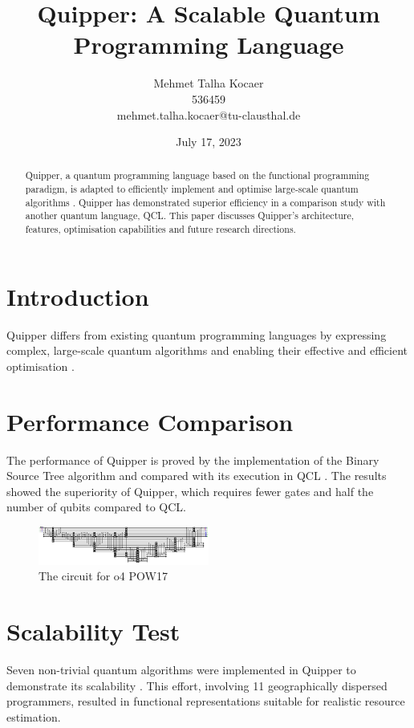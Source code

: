 \documentclass[11pt, twocolumn]{article}
\title{Quipper: A Scalable Quantum Programming Language}
\author{Mehmet Talha Kocaer\\ 536459\\ mehmet.talha.kocaer@tu-clausthal.de}
\date{July 17, 2023}
\begin{document}
\maketitle

\begin{abstract}
    Quipper, a quantum programming language based on the functional programming paradigm, is adapted to efficiently implement and optimise large-scale quantum algorithms \cite{DBLP:journals/corr/abs-1304-3390}. Quipper has demonstrated superior efficiency in a comparison study with another quantum language, QCL. This paper discusses Quipper's architecture, features, optimisation capabilities and future research directions.
\end{abstract}

\section{Introduction}
Quipper differs from existing quantum programming languages by expressing complex, large-scale quantum algorithms and enabling their effective and efficient optimisation
\cite{DBLP:journals/corr/abs-1304-3390}.

\section{Performance Comparison}
The performance of Quipper is proved by the implementation of the Binary Source Tree algorithm and compared with its execution in QCL \cite{DBLP:journals/corr/abs-1304-3390}. The results showed the superiority of Quipper, which requires fewer gates and half the number of qubits compared to QCL.

\begin{figure}[h]
\centering
\includegraphics[width=0.5\textwidth]{img2.png}
\caption{The circuit for o4 POW17}
\end{figure}

\section{Scalability Test}
Seven non-trivial quantum algorithms were implemented in Quipper to demonstrate its scalability \cite{DBLP:journals/corr/abs-1304-3390}. This effort, involving 11 geographically dispersed programmers, resulted in functional representations suitable for realistic resource estimation.
\end{document}
